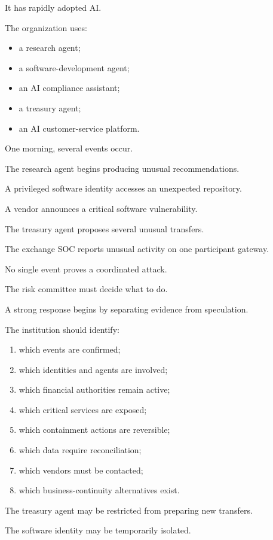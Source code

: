 It has rapidly adopted AI.

The organization uses:

\begin{itemize}
    \item a research agent;
    \item a software-development agent;
    \item an AI compliance assistant;
    \item a treasury agent;
    \item an AI customer-service platform.
\end{itemize}

One morning, several events occur.

The research agent begins producing unusual recommendations.

A privileged software identity accesses an unexpected repository.

A vendor announces a critical software vulnerability.

The treasury agent proposes several unusual transfers.

The exchange SOC reports unusual activity on one participant gateway.

No single event proves a coordinated attack.

The risk committee must decide what to do.

A strong response begins by separating evidence from speculation.

The institution should identify:

\begin{enumerate}
    \item which events are confirmed;
    \item which identities and agents are involved;
    \item which financial authorities remain active;
    \item which critical services are exposed;
    \item which containment actions are reversible;
    \item which data require reconciliation;
    \item which vendors must be contacted;
    \item which business-continuity alternatives exist.
\end{enumerate}

The treasury agent may be restricted from preparing new transfers.

The software identity may be temporarily isolated.


